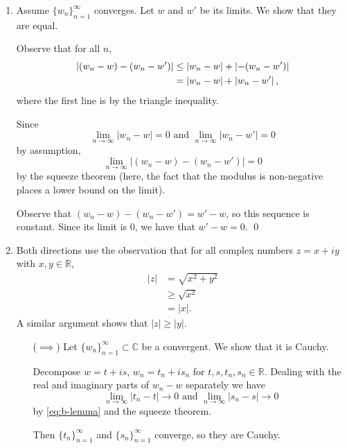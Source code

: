 \documentclass[oneside]{article}
\newcommand\abs[1]{\left|#1\right|}
\newcommand\bbC{\mathbb{C}}
\newcommand\bbR{\mathbb{R}}
\begin{document}
  \begin{enumerate}[label=\textbf{(\alph*)}]
    \item Assume $\{w_n\}_{n=1}^\infty$ converges. Let $w$ and $w'$ be its
      limits. We show that they are equal.

      Observe that for all $n$, \begin{align*}
        \abs{(w_n - w) - (w_n - w')}
        &\leq \abs{w_n - w} + \abs{-(w_n - w')} \\
        &= \abs{w_n - w} + \abs{w_n - w'}\text,
      \end{align*} where the first line is by the triangle inequality.

      Since \[
        \lim_{n\to\infty}\abs{w_n - w} = 0
        \text{ and }\lim_{n\to\infty}\abs{w_n - w'} = 0
      \] by assumption,\[
        \lim_{n\to\infty}\abs{(w_n - w) - (w_n - w')} = 0
      \] by the squeeze theorem (here, the fact that the modulus is non-negative
      places a lower bound on the limit).

      Observe that $(w_n - w) - (w_n - w') = w' - w$, so this sequence is
      constant. Since its limit is $0$, we have that $w' - w = 0$. \qed

    \item Both directions use the observation that for all complex numbers
      $z = x + iy$ with $x, y \in \bbR$,
      \begin{align} \label{eq:b-lemma}
        \abs{z} &= \sqrt{x^2 + y^2} \nonumber\\
        &\geq \sqrt{x^2} \\
        &= \abs{x} \text{.} \nonumber
      \end{align} A similar argument shows that $\abs{z} \geq \abs{y}$.

      \begin{itemize}[leftmargin=34pt]
      \item[($\implies$)] Let $\{w_n\}_{n=1}^\infty \subset \bbC$ be a
        convergent. We show that it is Cauchy.

      Decompose $w = t + is$, $w_n = t_n + is_n$ for $t, s, t_n, s_n \in \bbR$.
      Dealing with the real and imaginary parts of $w_n - w$ separately we have
      \[
        \lim_{n\to\infty} \abs{t_n - t} \to 0
        \text{ and } \lim_{n\to\infty} \abs{s_n - s} \to 0
      \] by \eqref{eq:b-lemma} and the squeeze theorem.

      Then $\{t_n\}_{n=1}^\infty$ and $\{s_n\}_{n=1}^\infty$ converge, so they
      are Cauchy.


\end{itemize}
\end{enumerate}
\end{document}
